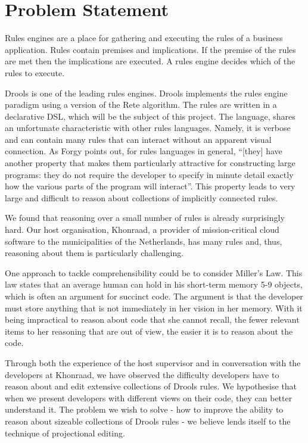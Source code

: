 \section{Problem Statement}
\label{section:problem_statement}

Rules engines are a place for gathering and executing the rules of a business application.
Rules contain premises and implications.
If the premise of the rules are met then the implications are executed.
A rules engine decides which of the rules to execute.

Drools is one of the leading rules engines.
Drools implements the rules engine paradigm using a version of the Rete algorithm.
The rules are written in a declarative DSL, which will be the subject of this project.
The language, shares an unfortunate characteristic with other rules languages.
Namely, it is verbose and can contain many rules that can interact without an apparent visual connection.
As Forgy\cite{forgy1989rete} points out, for rules languages in general, ``[they] have another property that makes them particularly attractive for constructing large programs: they do not require the developer to specify in minute detail exactly how the various parts of the program will interact''.
This property leads to very large and difficult to reason about collections of implicitly connected rules.

We found that reasoning over a small number of rules is already surprisingly hard.
Our host organisation, Khonraad, a provider of mission-critical cloud software to the municipalities of the Netherlands, has many rules and, thus, reasoning about them is particularly challenging.

One approach to tackle comprehensibility could be to consider Miller's Law\cite{miller1956magical}.
This law states that an average human can hold in his short-term memory 5-9 objects, which is often an argument for succinct code.
The argument is that the developer must store anything that is not immediately in her vision in her memory.
With it being impractical to reason about code that she cannot recall, the fewer relevant items to her reasoning that are out of view, the easier it is to reason about the code.

Through both the experience of the host supervisor and in conversation with the developers at Khonraad, we have observed the difficulty developers have to reason about and edit extensive collections of Drools rules.
We hypothesise that when we present developers with different views on their code, they can better understand it.
The problem we wish to solve - how to improve the ability to reason about sizeable collections of Drools rules - we believe lends itself to the technique of projectional editing.


